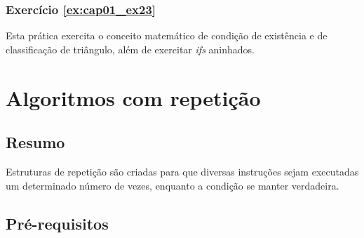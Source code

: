 \subsection*{Exercício \ref{ex:cap01_ex23}}

Esta prática exercita o conceito matemático de condição de existência e de classificação de triângulo, além de exercitar \emph{ifs} aninhados.


\chapter[Algoritmos com repetição]
{Algoritmos com repetição}



\section*{Resumo}

Estruturas de repetição são criadas para que diversas instruções sejam executadas um determinado número de vezes, enquanto a condição se manter verdadeira.


%







\section*{Pré-requisitos}

